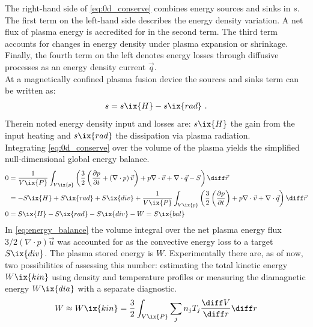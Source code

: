 %
            The right-hand side of \cref{eq:0d_conserve} combines energy sources and sinks in $s$. The first term on the left-hand side describes the energy density variation. A net flux of plasma energy is accredited for in the second term. The third term accounts for changes in energy density under plasma expansion or shrinkage. Finally, the fourth term on the left denotes energy losses through diffusive processes as an energy density current $\vec{q}$.\\%
            At a magnetically confined plasma fusion device the sources and sinks term can be written as\cite{Bozhenkov2016}:%
%
            \begin{align}%
                s=s\ix{H}-s\ix{rad}\,\,.\nonumber%
            \end{align}%
%
            Therein noted energy density input and losses are: $s\ix{H}$ the gain from the input heating and $s\ix{rad}$ the dissipation via plasma radiation.\\%
            Integrating \cref{eq:0d_conserve} over the volume of the plasma yields the simplified null-dimensional global energy balance.%
%
            \begin{align}%
                0&=\frac{1}{V\ix{P}}\int_{V\ix{p}}\left(\frac{3}{2}\left(\frac{\partial p}{\partial t}+\left(\nabla\cdot p\right)\vec{v}\right)+p\nabla\cdot\vec{v}+\nabla\cdot\vec{q}-S\right)\diff\vec{r}\nonumber\\%
                &=-S\ix{H}+S\ix{rad}+S\ix{div}+\frac{1}{V\ix{P}}\int_{V\ix{p}}\left(\frac{3}{2}\left(\frac{\partial p}{\partial t}\right)+p\nabla\cdot\vec{v}+\nabla\cdot\vec{q}\right)\diff\vec{r}\nonumber\\%
                0&=S\ix{H}-S\ix{rad}-S\ix{div}-W=S\ix{bal}\label{eq:energy_balance}%
            \end{align}%
%
            In \cref{eq:energy_balance} the volume integral over the net plasma energy flux $3/2\left(\nabla\cdot p\right)\vec{u}$ was accounted for as the convective energy loss to a target $S\ix{div}$. The plasma stored energy is $W$. Experimentally there are, as of now, two possibilities of assessing this number: estimating the total kinetic energy $W\ix{kin}$ using density and temperature profiles or measuring the diamagnetic energy $W\ix{dia}$ with a separate diagnostic.
%
            \begin{align}%
                W\approx W\ix{kin}=\frac{3}{2}\int_{V\ix{P}}\sum_{j}n_{j}T_{j}\frac{\diff V}{\diff r}\diff r\nonumber%
            \end{align}%
